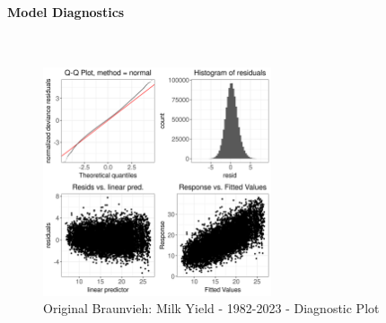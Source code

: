 \paragraph{Model Diagnostics} \quad \\
\begin{figure}[H]
    \centering
    \includegraphics[width=0.6\textwidth]{thesis/figures/models/milk/full/ob_milk_full/ob_milk_full_diagnostics.png}
    \caption[]{Original Braunvieh: Milk Yield - 1982-2023 - Diagnostic Plot}
\end{figure}

\newpage
